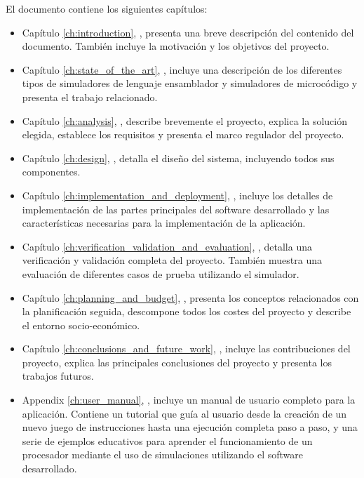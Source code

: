 El documento contiene los siguientes capítulos:

\begin{itemize}

\item Capítulo \ref{ch:introduction}, \textit{}, presenta una breve descripción del contenido del documento. También incluye la motivación y los objetivos del proyecto.

\item Capítulo \ref{ch:state_of_the_art}, \textit{}, incluye una descripción de los diferentes tipos de simuladores de lenguaje ensamblador y simuladores de microcódigo y presenta el trabajo relacionado.

\item Capítulo \ref{ch:analysis}, \textit{}, describe brevemente el proyecto, explica la solución elegida, establece los requisitos y presenta el marco regulador del proyecto.

\item Capítulo \ref{ch:design}, \textit{}, detalla el diseño del sistema, incluyendo todos sus componentes.

\item Capítulo \ref{ch:implementation_and_deployment}, \textit{}, incluye los detalles de implementación de las partes principales del software desarrollado y las características necesarias para la implementación de la aplicación.

\item Capítulo \ref{ch:verification_validation_and_evaluation}, \textit{}, detalla una verificación y validación completa del proyecto. También muestra una evaluación de diferentes casos de prueba utilizando el simulador.

\item Capítulo \ref{ch:planning_and_budget}, \textit{}, presenta los conceptos relacionados con la planificación seguida, descompone todos los costes del proyecto y describe el entorno socio-económico.

\item Capítulo \ref{ch:conclusions_and_future_work}, \textit{}, incluye las contribuciones del proyecto, explica las principales conclusiones del proyecto y presenta los trabajos futuros.

\item Appendix \ref{ch:user_manual}, \textit{}, incluye un manual de usuario completo para la aplicación. Contiene un tutorial que guía al usuario desde la creación de un nuevo juego de instrucciones hasta una ejecución completa paso a paso, y una serie de ejemplos educativos para aprender el funcionamiento de un procesador mediante el uso de simulaciones utilizando el software desarrollado. 

\end{itemize}

